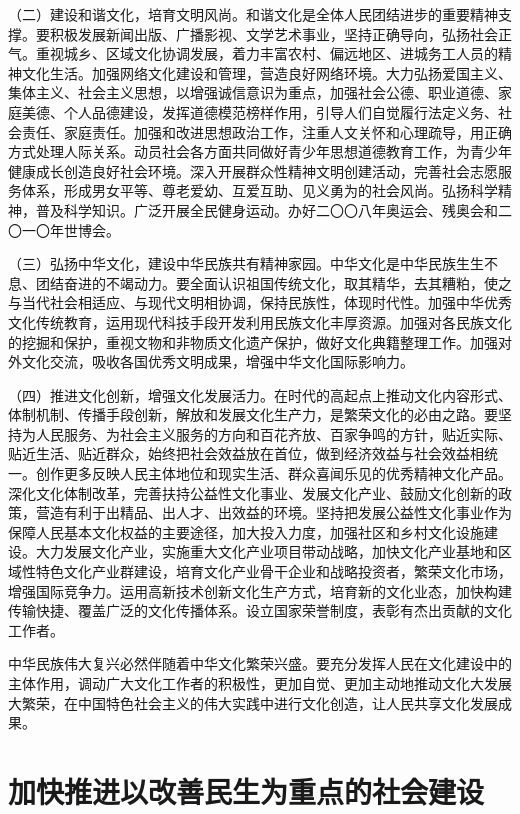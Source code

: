 （二）建设和谐文化，培育文明风尚。和谐文化是全体人民团结进步的重要精神支撑。要积极发展新闻出版、广播影视、文学艺术事业，坚持正确导向，弘扬社会正气。重视城乡、区域文化协调发展，着力丰富农村、偏远地区、进城务工人员的精神文化生活。加强网络文化建设和管理，营造良好网络环境。大力弘扬爱国主义、集体主义、社会主义思想，以增强诚信意识为重点，加强社会公德、职业道德、家庭美德、个人品德建设，发挥道德模范榜样作用，引导人们自觉履行法定义务、社会责任、家庭责任。加强和改进思想政治工作，注重人文关怀和心理疏导，用正确方式处理人际关系。动员社会各方面共同做好青少年思想道德教育工作，为青少年健康成长创造良好社会环境。深入开展群众性精神文明创建活动，完善社会志愿服务体系，形成男女平等、尊老爱幼、互爱互助、见义勇为的社会风尚。弘扬科学精神，普及科学知识。广泛开展全民健身运动。办好二〇〇八年奥运会、残奥会和二〇一〇年世博会。

（三）弘扬中华文化，建设中华民族共有精神家园。中华文化是中华民族生生不息、团结奋进的不竭动力。要全面认识祖国传统文化，取其精华，去其糟粕，使之与当代社会相适应、与现代文明相协调，保持民族性，体现时代性。加强中华优秀文化传统教育，运用现代科技手段开发利用民族文化丰厚资源。加强对各民族文化的挖掘和保护，重视文物和非物质文化遗产保护，做好文化典籍整理工作。加强对外文化交流，吸收各国优秀文明成果，增强中华文化国际影响力。

（四）推进文化创新，增强文化发展活力。在时代的高起点上推动文化内容形式、体制机制、传播手段创新，解放和发展文化生产力，是繁荣文化的必由之路。要坚持为人民服务、为社会主义服务的方向和百花齐放、百家争鸣的方针，贴近实际、贴近生活、贴近群众，始终把社会效益放在首位，做到经济效益与社会效益相统一。创作更多反映人民主体地位和现实生活、群众喜闻乐见的优秀精神文化产品。深化文化体制改革，完善扶持公益性文化事业、发展文化产业、鼓励文化创新的政策，营造有利于出精品、出人才、出效益的环境。坚持把发展公益性文化事业作为保障人民基本文化权益的主要途径，加大投入力度，加强社区和乡村文化设施建设。大力发展文化产业，实施重大文化产业项目带动战略，加快文化产业基地和区域性特色文化产业群建设，培育文化产业骨干企业和战略投资者，繁荣文化市场，增强国际竞争力。运用高新技术创新文化生产方式，培育新的文化业态，加快构建传输快捷、覆盖广泛的文化传播体系。设立国家荣誉制度，表彰有杰出贡献的文化工作者。

中华民族伟大复兴必然伴随着中华文化繁荣兴盛。要充分发挥人民在文化建设中的主体作用，调动广大文化工作者的积极性，更加自觉、更加主动地推动文化大发展大繁荣，在中国特色社会主义的伟大实践中进行文化创造，让人民共享文化发展成果。

\section{加快推进以改善民生为重点的社会建设}

